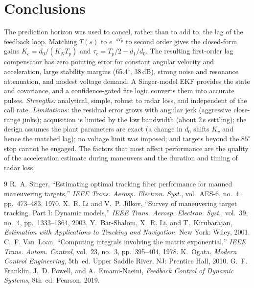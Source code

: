 \documentclass[conference]{IEEEtran}
\newcommand{\Tp}{T_p}
\begin{document}
\section{Conclusions}
The prediction horizon was used to cancel, rather than to add to, the lag
of the feedback loop. Matching $T(s)$ to $e^{-s\Tp}$ to second order gives the
closed-form gains $K_c=d_0/(K_N\Tp)$ and $\tau_c=\Tp/2-d_1/d_0$. The resulting
first-order lag compensator has zero pointing error for constant angular velocity
and acceleration, large stability margins (65.4$^\circ$, 38\,dB), strong noise
and resonance attenuation, and modest voltage demand. A Singer-model EKF
provides the state and covariance, and a confidence-gated fire logic converts
them into accurate pulses. \emph{Strengths:} analytical, simple, robust to radar
loss, and independent of the call rate. \emph{Limitations:} the residual error
grows with angular jerk (aggressive close-range jinks); acquisition is limited by
the low bandwidth (about 2\,s settling); the design assumes the plant parameters
are exact (a change in $d_0$ shifts $K_v$ and hence the matched lag); no voltage
limit was imposed; and targets beyond the $85^\circ$ stop cannot be engaged. The
factors that most affect performance are the quality of the acceleration
estimate during maneuvers and the duration and timing of radar loss.

\begin{thebibliography}{9}
 R.~A. Singer, ``Estimating optimal tracking filter performance for manned maneuvering targets,'' \emph{IEEE Trans. Aerosp. Electron. Syst.}, vol.~AES-6, no.~4, pp.~473--483, 1970.
 X.~R. Li and V.~P. Jilkov, ``Survey of maneuvering target tracking. Part I: Dynamic models,'' \emph{IEEE Trans. Aerosp. Electron. Syst.}, vol.~39, no.~4, pp.~1333--1364, 2003.
 Y.~Bar-Shalom, X.~R. Li, and T.~Kirubarajan, \emph{Estimation with Applications to Tracking and Navigation}. New York: Wiley, 2001.
 C.~F. Van~Loan, ``Computing integrals involving the matrix exponential,'' \emph{IEEE Trans. Autom. Control}, vol.~23, no.~3, pp.~395--404, 1978.
 K.~Ogata, \emph{Modern Control Engineering}, 5th~ed. Upper Saddle River, NJ: Prentice Hall, 2010.
 G.~F. Franklin, J.~D. Powell, and A.~Emami-Naeini, \emph{Feedback Control of Dynamic Systems}, 8th~ed. Pearson, 2019.
\end{thebibliography}
\end{document}
